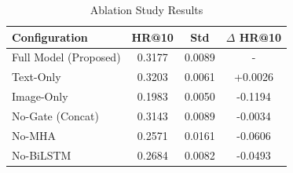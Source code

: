 
\begin{table}[htbp]
\centering
\caption{Ablation Study Results}
\label{tab:ablation}
\begin{tabular}{l|cc|c}
\toprule
\textbf{Configuration} & \textbf{HR@10} & \textbf{Std} & \textbf{$\Delta$ HR@10} \\
\midrule
Full Model (Proposed) & 0.3177 & 0.0089 & - \\
\midrule
Text-Only & 0.3203 & 0.0061 & +0.0026 \\
Image-Only & 0.1983 & 0.0050 & -0.1194 \\
No-Gate (Concat) & 0.3143 & 0.0089 & -0.0034 \\
No-MHA & 0.2571 & 0.0161 & -0.0606 \\
No-BiLSTM & 0.2684 & 0.0082 & -0.0493 \\
\bottomrule
\end{tabular}
\end{table}
